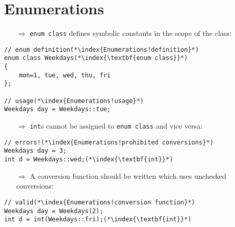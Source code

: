 \documentclass[10pt]{article}
\begin{document}
\section{Enumerations}
\small
\begin{enumerate}
\item[$\Rightarrow$] \texttt{enum class} defines symbolic constants in the scope of the class:
\end{enumerate}
\begin{lstlisting}
// enum definition(*\index{Enumerations!definition}*)
enum class Weekdays(*\index{\textbf{enum class}}*)
{
    mon=1, tue, wed, thu, fri
};

// usage(*\index{Enumerations!usage}*)
Weekdays day = Weekdays::tue;
\end{lstlisting}
\begin{enumerate}
\item[$\Rightarrow$] \texttt{int}s cannot be assigned to \texttt{enum class} and vice versa:
\end{enumerate}
\begin{lstlisting}
// errors!(*\index{Enumerations!prohibited conversions}*)
Weekdays day = 3;
int d = Weekdays::wed;(*\index{\textbf{int}}*)
\end{lstlisting}
\begin{enumerate}
\item[$\Rightarrow$] A conversion function should be written which uses unchecked conversions:
\end{enumerate}
\begin{lstlisting}
// valid(*\index{Enumerations!conversion function}*)
Weekdays day = Weekdays(2);
int d = int(Weekdays::fri);(*\index{\textbf{int}}*)
\end{lstlisting}
%
%
\end{document}
